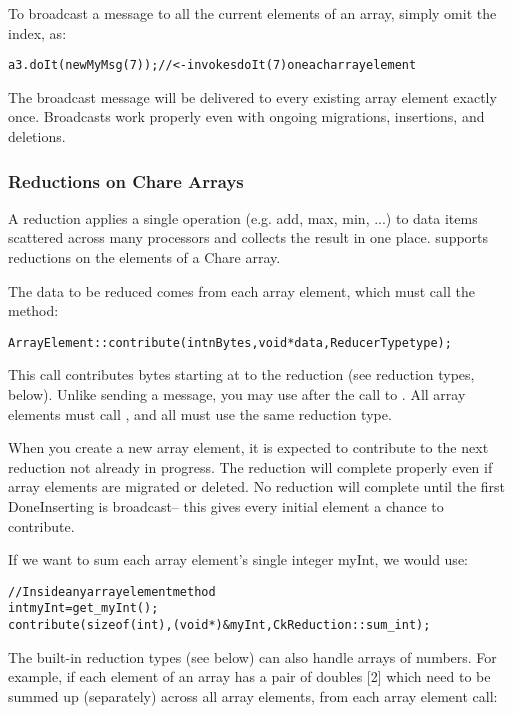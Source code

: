 To  broadcast a message to all the current elements of an array, 
simply omit the index, as:

\begin{alltt}
a3.doIt(new MyMsg(7)); //<- invokes doIt(7) on each array element
\end{alltt}

The broadcast message will be delivered to every existing array 
element exactly once.  Broadcasts work properly even with ongoing
migrations, insertions, and deletions.


\subsubsection{Reductions on Chare Arrays}
A reduction applies a single operation (e.g. add,
max, min, ...) to data items scattered across many processors and
collects the result in one place.  \charmpp{} supports reductions on the
elements of a Chare array.

The data to be reduced comes from each array element, 
which must call the  method:

\begin{alltt}
ArrayElement::contribute(int nBytes,void *data,ReducerType type);
\end{alltt}

This call contributes  bytes starting at  to the
reduction  (see reduction types, below).  Unlike sending a
message, you may use  after the call to .  All
array elements must call , and all must use the same
reduction type.  

When you create a new array element, it is expected
to contribute to the next reduction not already in progress.  The
reduction will complete properly even if array elements are migrated
or deleted. No reduction will complete until the first DoneInserting
is broadcast-- this gives every initial element a chance to contribute.

If we want to sum each array element's single integer myInt, we would use:

\begin{alltt}
    //Inside any array element method
    int myInt=get_myInt();
    contribute(sizeof(int),(void *)\&myInt,CkReduction::sum_int);
\end{alltt}

The built-in reduction types (see below) can also handle arrays of
numbers.  For example, if each element of an array has a pair of
doubles [2] which need to be summed up (separately) across
all array elements, from each array element call:

